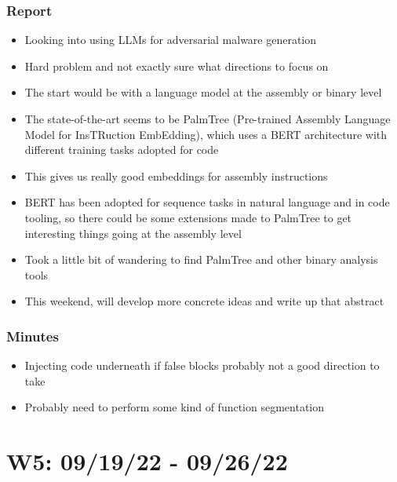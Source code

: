 \documentclass{article}
\begin{document}
\subsubsection*{Report}
\begin{itemize}
	\item Looking into using LLMs for adversarial malware generation
	\item Hard problem and not exactly sure what directions to focus on
	\item The start would be with a language model at the assembly or binary level
	\item The state-of-the-art seems to be PalmTree (Pre-trained Assembly Language Model for InsTRuction EmbEdding), which uses a BERT architecture with different training tasks adopted for code
	\item This gives us really good embeddings for assembly instructions
	\item BERT has been adopted for sequence tasks in natural language and in code tooling, so there could be some extensions made to PalmTree to get interesting things going at the assembly level
	\item Took a little bit of wandering to find PalmTree and other binary analysis tools
	\item This weekend, will develop more concrete ideas and write up that abstract
\end{itemize}
\subsubsection*{Minutes}
\begin{itemize}
	\item Injecting code underneath if false blocks probably not a good direction to take
	\item Probably need to perform some kind of function segmentation
\end{itemize}

\pagebreak

\section*{W5: 09/19/22 - 09/26/22}

\end{document}
